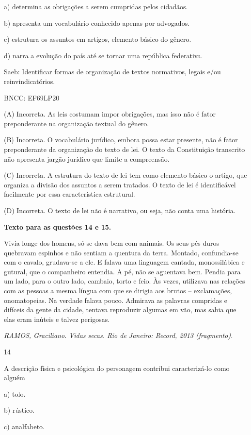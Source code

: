 a) determina as obrigações a serem cumpridas pelos cidadãos.

b) apresenta um vocabulário conhecido apenas por advogados.

c) estrutura os assuntos em artigos, elemento básico do gênero.

d) narra a evolução do país até se tornar uma república federativa.

Saeb: Identificar formas de organização de textos normativos, legais
e/ou reinvindicatórios.

BNCC: EF69LP20

(A) Incorreta. As leis costumam impor obrigações, mas isso não é fator
preponderante na organização textual do gênero.

(B) Incorreta. O vocabulário jurídico, embora possa estar presente, não
é fator preponderante da organização do texto de lei. O texto da
Constituição transcrito não apresenta jargão jurídico que limite a
compreensão.

(C) Incorreta. A estrutura do texto de lei tem como elemento básico o
artigo, que organiza a divisão dos assuntos a serem tratados. O texto de
lei é identificável facilmente por essa característica estrutural.

(D) Incorreta. O texto de lei não é narrativo, ou seja, não conta uma
história.

\textbf{Texto para as questões 14 e 15.}

Vivia longe dos homens, só se dava bem com animais. Os seus pés duros
quebravam espinhos e não sentiam a quentura da terra. Montado,
confundia-se com o cavalo, grudava-se a ele. E falava uma linguagem
cantada, monossilábica e gutural, que o companheiro entendia. A pé, não
se aguentava bem. Pendia para um lado, para o outro lado, cambaio, torto
e feio. Às vezes, utilizava nas relações com as pessoas a mesma língua
com que se dirigia aos brutos -- exclamações, onomatopeias. Na verdade
falava pouco. Admirava as palavras compridas e difíceis da gente da
cidade, tentava reproduzir algumas em vão, mas sabia que elas eram
inúteis e talvez perigosas.

\emph{RAMOS, Graciliano. Vidas secas. Rio de Janeiro: Record, 2013
(fragmento).}

\num{14}

A descrição física e psicológica do personagem contribui caracterizá-lo
como alguém

a) tolo.

b) rústico.

c) analfabeto.

